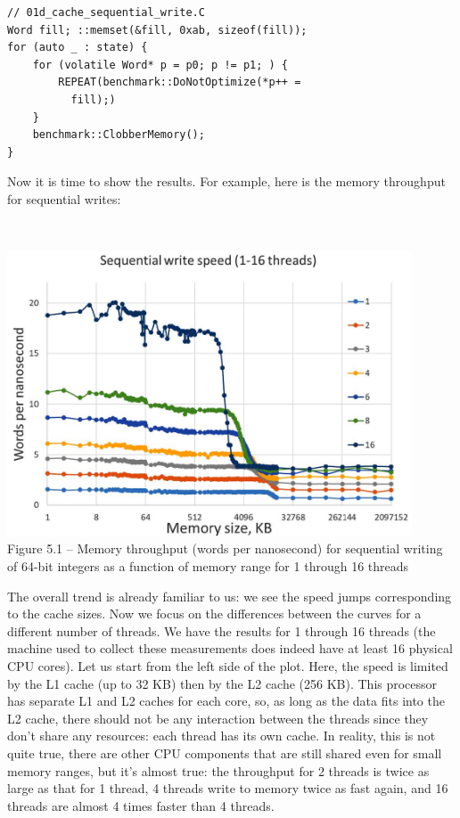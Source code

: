 \begin{lstlisting}[style=styleCXX]
// 01d_cache_sequential_write.C
Word fill; ::memset(&fill, 0xab, sizeof(fill));
for (auto _ : state) {
	for (volatile Word* p = p0; p != p1; ) {
		REPEAT(benchmark::DoNotOptimize(*p++ =
		  fill);)
	}
	benchmark::ClobberMemory();
}
\end{lstlisting}

Now it is time to show the results. For example, here is the memory throughput for sequential writes:

\hspace*{\fill} \\ %
\begin{center}
\includegraphics[width=0.9\textwidth]{content/1/chapter5/images/1.jpg}\\
Figure 5.1 – Memory throughput (words per nanosecond) for sequential writing of 64-bit integers as a function of memory range for 1 through 16 threads
\end{center}

The overall trend is already familiar to us: we see the speed jumps corresponding to the cache sizes. Now we focus on the differences between the curves for a different number of threads. We have the results for 1 through 16 threads (the machine used to collect these measurements does indeed have at least 16 physical CPU cores). Let us start from the left side of the plot. Here, the speed is limited by the L1 cache (up to 32 KB) then by the L2 cache (256 KB). This processor has separate L1 and L2 caches for each core, so, as long as the data fits into the L2 cache, there should not be any interaction between the threads since they don't share any resources: each thread has its own cache. In reality, this is not quite true, there are other CPU components that are still shared even for small memory ranges, but it's almost true: the throughput for 2 threads is twice as large as that for 1 thread, 4 threads write to memory twice as fast again, and 16 threads are almost 4 times faster than 4 threads.


